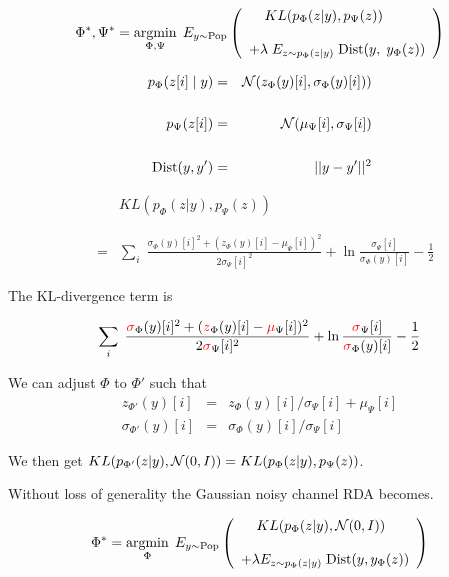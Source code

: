 {$$\Phi^*,\Psi^* = \operatorname*{argmin}_{\Phi,\Psi}\;E_{y\sim \mathrm{Pop}} \left(\begin{array}{l}\;\;\;\;KL(p_\Phi(z|y),p_\Psi(z)) \\
\\
+ \lambda \; E_{z\sim p_\Phi(z|y)}\;\mathrm{Dist}(y,\;y_\Phi(z))\end{array}\right)$$

{\color{red}
\begin{eqnarray*}
p_\Phi(z[i]\;|\;y) & = & {\cal N}(z_\Phi(y)[i],\sigma_\Phi(y)[i])) \\
\\
p_\Psi(z[i]) & = & {\cal N}(\mu_\Psi[i],\sigma_\Psi[i]) \\
\\
\mathrm{Dist}(y,y') & = & ||y-y'||^2
\end{eqnarray*}
}


\begin{eqnarray*}
& & KL(p_\Phi(z|y),p_\Psi(z)) \\
\\
\\
& = & \sum_i \;\frac{\sigma_\Phi(y)[i]^2 + (z_\Phi(y)[i]-\mu_\Psi[i])^2}{2 \sigma_\Psi[i]^2}
+ \ln\frac{\sigma_\Psi[i]}{\sigma_\Phi(y)[i]} - \frac{1}{2}
\end{eqnarray*}



The KL-divergence term is
    
$$\sum_i \;\frac{{\color{red} \sigma}_\Phi(y)[i]^2 +({\color{red}
z}_\Phi(y)[i] - {\color{red} \mu}_\Psi[i])^2}{2
{\color{red} \sigma}_\Psi[i]^2}
+ \ln\frac{{\color{red} \sigma}_\Psi[i]}{{\color{red} \sigma}_\Phi(y)[i]}
- \frac{1}{2}$$

\vfill
We can adjust $\Phi$ to $\Phi'$ such that
\begin{eqnarray*}
z_{\Phi'}(y)[i] & = & z_\Phi(y)[i]/\sigma_\Psi[i] + \mu_\Psi[i] \\
\sigma_{\Phi'}(y)[i] & = & \sigma_\Phi(y)[i]/\sigma_\Psi[i]
\end{eqnarray*}

\vfill
We then get {\color{red} $KL(p_{\Phi'}(z|y),{\cal N}(0,I)) = KL(p_{\Phi}(z|y),p_\Psi(z))$}.


\vfill
Without loss of generality the Gaussian noisy channel RDA becomes.

{\color{red} $$\Phi^* = \operatorname*{argmin}_{\Phi}\; E_{y \sim \mathrm{Pop}}\left(\begin{array}{l}\;\;\;\;KL(p_\Phi(z|y),{\cal N}(0,I)) \\
\\
+ \lambda E_{z \sim p_\Phi(z|y)}\;\mathrm{Dist}(y,y_\Phi(z))\end{array}\right) $$}

}
